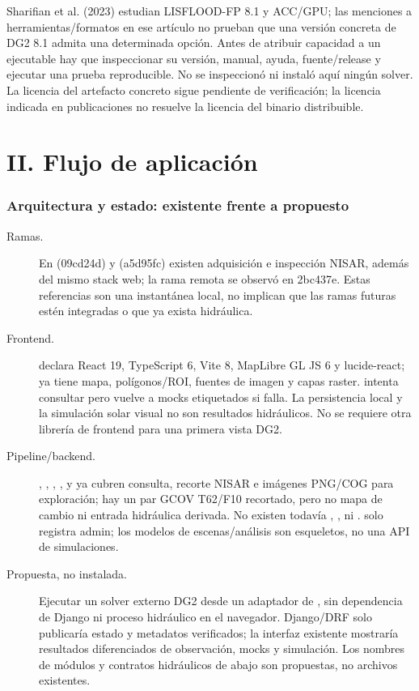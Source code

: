 \documentclass[11pt,a4paper]{article}
\begin{document}
Sharifian et al. (2023) estudian LISFLOOD-FP 8.1 y ACC/GPU; las menciones a herramientas/formatos en ese artículo no prueban que una versión concreta de DG2 8.1 admita una determinada opción. Antes de atribuir capacidad a un ejecutable hay que inspeccionar su versión, manual, ayuda, fuente/release y ejecutar una prueba reproducible. No se inspeccionó ni instaló aquí ningún solver. La licencia del artefacto concreto sigue pendiente de verificación; la licencia indicada en publicaciones no resuelve la licencia del binario distribuible.

\part{II. Flujo de aplicación}
\section{Arquitectura y estado: existente frente a propuesto}
\begin{description}
\item[Ramas.] En  (09cd24d) y  (a5d95fc) existen adquisición e inspección NISAR, además del mismo stack web; la rama remota  se observó en 2bc437e. Estas referencias son una instantánea local, no implican que las ramas futuras estén integradas o que ya exista hidráulica.
\item[Frontend.]  declara React 19, TypeScript 6, Vite 8, MapLibre GL JS 6 y lucide-react;  ya tiene mapa, polígonos/ROI, fuentes de imagen y capas raster.  intenta consultar  pero vuelve a mocks etiquetados si falla. La persistencia local y la simulación solar visual no son resultados hidráulicos. No se requiere otra librería de frontend para una primera vista DG2.
\item[Pipeline/backend.] , , , ,  y  ya cubren consulta, recorte NISAR e imágenes PNG/COG para exploración; hay un par GCOV T62/F10 recortado, pero no mapa de cambio ni entrada hidráulica derivada. No existen todavía , ,  ni .  solo registra admin; los modelos de escenas/análisis son esqueletos, no una API de simulaciones.
\item[Propuesta, no instalada.] Ejecutar un solver externo DG2 desde un adaptador de , sin dependencia de Django ni proceso hidráulico en el navegador. Django/DRF solo publicaría estado y metadatos verificados; la interfaz existente mostraría resultados diferenciados de observación, mocks y simulación. Los nombres de módulos y contratos hidráulicos de abajo son propuestas, no archivos existentes.
\end{description}
\end{document}
